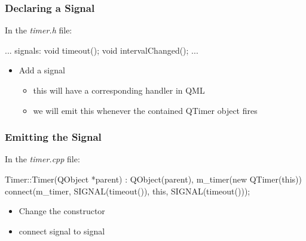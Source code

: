 
\begin{slide}[fragile]\frametitle{Declaring a Signal}

In the \textit{timer.h} file:

\vspace*{0.5em}
\begin{cpp}
...
signals:
    void timeout();
    void intervalChanged();
...
\end{cpp}

\begin{itemize}
\item Add a  signal
  \begin{itemize}
  \item this will have a corresponding  handler in QML
  \item we will emit this whenever the contained QTimer object fires
  \end{itemize}
\end{itemize}

\end{slide}



\begin{slide}[fragile]\frametitle{Emitting the Signal}

In the \textit{timer.cpp} file:

\vspace*{0.5em}
\begin{cpp}
Timer::Timer(QObject *parent)
    : QObject(parent),
      m_timer(new QTimer(this))
{
    connect(m_timer, SIGNAL(timeout()),
            this, SIGNAL(timeout()));
}
\end{cpp}

\begin{itemize}
\item Change the constructor
\item connect  signal to  signal
\end{itemize}

\end{slide}




